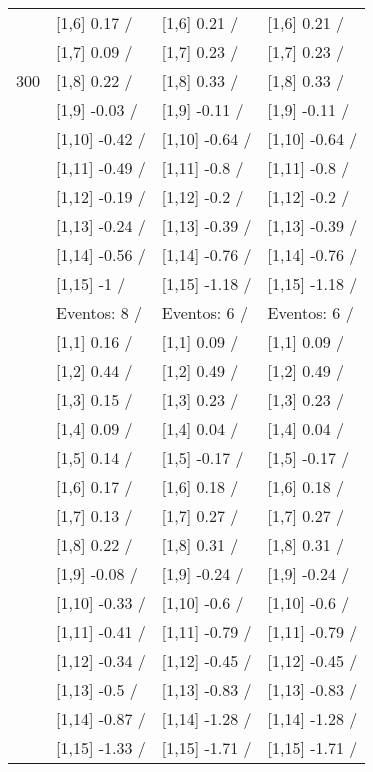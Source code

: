 \begin{table}
\begin{tabular}[t]{llll}
 & {}[1,6] 0.17  / & {}[1,6] 0.21  / & {}[1,6] 0.21  /\\
 & {}[1,7] 0.09  / & {}[1,7] 0.23  / & {}[1,7] 0.23  /\\
300 & {}[1,8] 0.22  / & {}[1,8] 0.33  / & {}[1,8] 0.33  /\\
\addlinespace
 & {}[1,9] -0.03  / & {}[1,9] -0.11  / & {}[1,9] -0.11  /\\
 & {}[1,10] -0.42  / & {}[1,10] -0.64  / & {}[1,10] -0.64  /\\
 & {}[1,11] -0.49  / & {}[1,11] -0.8  / & {}[1,11] -0.8  /\\
 & {}[1,12] -0.19  / & {}[1,12] -0.2  / & {}[1,12] -0.2  /\\
 & {}[1,13] -0.24  / & {}[1,13] -0.39  / & {}[1,13] -0.39  /\\
\addlinespace
 & {}[1,14] -0.56  / & {}[1,14] -0.76  / & {}[1,14] -0.76  /\\
 & {}[1,15] -1  / & {}[1,15] -1.18  / & {}[1,15] -1.18  /\\
 & Eventos:  8 / & Eventos:  6 / & Eventos:  6 /\\
 & {}[1,1] 0.16  / & {}[1,1] 0.09  / & {}[1,1] 0.09  /\\
 & {}[1,2] 0.44  / & {}[1,2] 0.49  / & {}[1,2] 0.49  /\\
\addlinespace
 & {}[1,3] 0.15  / & {}[1,3] 0.23  / & {}[1,3] 0.23  /\\
 & {}[1,4] 0.09  / & {}[1,4] 0.04  / & {}[1,4] 0.04  /\\
 & {}[1,5] 0.14  / & {}[1,5] -0.17  / & {}[1,5] -0.17  /\\
 & {}[1,6] 0.17  / & {}[1,6] 0.18  / & {}[1,6] 0.18  /\\
 & {}[1,7] 0.13  / & {}[1,7] 0.27  / & {}[1,7] 0.27  /\\
\addlinespace
500 & {}[1,8] 0.22  / & {}[1,8] 0.31  / & {}[1,8] 0.31  /\\
 & {}[1,9] -0.08  / & {}[1,9] -0.24  / & {}[1,9] -0.24  /\\
 & {}[1,10] -0.33  / & {}[1,10] -0.6  / & {}[1,10] -0.6  /\\
 & {}[1,11] -0.41  / & {}[1,11] -0.79  / & {}[1,11] -0.79  /\\
 & {}[1,12] -0.34  / & {}[1,12] -0.45  / & {}[1,12] -0.45  /\\
\addlinespace
 & {}[1,13] -0.5  / & {}[1,13] -0.83  / & {}[1,13] -0.83  /\\
 & {}[1,14] -0.87  / & {}[1,14] -1.28  / & {}[1,14] -1.28  /\\
 & {}[1,15] -1.33  / & {}[1,15] -1.71  / & {}[1,15] -1.71  /\\
\bottomrule
\end{tabular}
\end{table}
